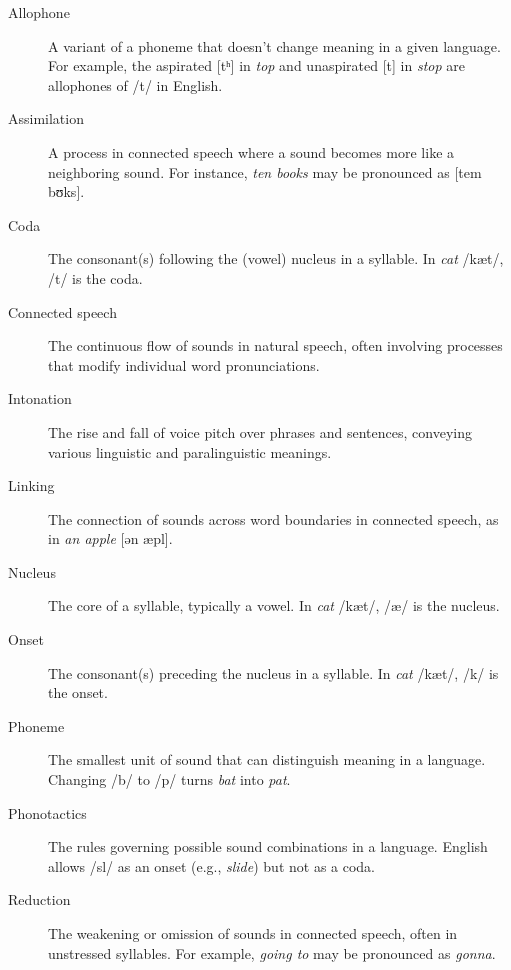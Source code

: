 \begin{description}
    \item[Allophone] A variant of a phoneme that doesn't change meaning in a given language. For example, the aspirated [tʰ] in \textit{top} and unaspirated [t] in \textit{stop} are allophones of /t/ in English.
    
    \item[Assimilation] A process in connected speech where a sound becomes more like a neighboring sound. For instance, \textit{ten books} may be pronounced as [tem bʊks].
    
    \item[Coda] The consonant(s) following the (vowel) nucleus in a syllable. In \textit{cat} /kæt/, /t/ is the coda.
    
    \item[Connected speech] The continuous flow of sounds in natural speech, often involving processes that modify individual word pronunciations.
    
    \item[Intonation] The rise and fall of voice pitch over phrases and sentences, conveying various linguistic and paralinguistic meanings.
    
    \item[Linking] The connection of sounds across word boundaries in connected speech, as in \textit{an apple} [ən æpl].
    
    \item[Nucleus] The core of a syllable, typically a vowel. In \textit{cat} /kæt/, /æ/ is the nucleus.
    
    \item[Onset] The consonant(s) preceding the nucleus in a syllable. In \textit{cat} /kæt/, /k/ is the onset.
    
    \item[Phoneme] The smallest unit of sound that can distinguish meaning in a language. Changing /b/ to /p/ turns \textit{bat} into \textit{pat}.
    
    \item[Phonotactics] The rules governing possible sound combinations in a language. English allows /sl/ as an onset (e.g., \textit{slide}) but not as a coda.
    
    \item[Reduction] The weakening or omission of sounds in connected speech, often in unstressed syllables. For example, \textit{going to} may be pronounced as \textit{gonna}.
    

\end{description}
